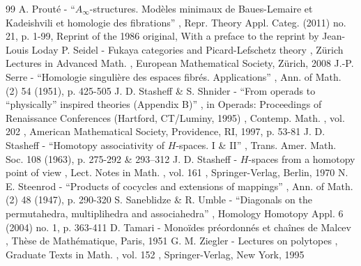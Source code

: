 \documentclass[10pt,a4paper]{amsart}
\numberwithin{equation}{section}\providecommand{\No}{}
\theoremstyle{plain}
\theoremstyle{definition}
\begin{document}
\begin{thebibliography}{99}
 A. Prouté - “$A_\infty $-structures. Modèles minimaux de Baues-Lemaire et Kadeishvili et homologie des fibrations” , Repr. Theory Appl. Categ. (2011) no. 21, p. 1-99, Reprint of the 1986 original, With a preface to the reprint by Jean-Louis Loday
 P. Seidel - Fukaya categories and Picard-Lefschetz theory , Zürich Lectures in Advanced Math. , European Mathematical Society, Zürich, 2008
 J.-P. Serre - “Homologie singulière des espaces fibrés. Applications” , Ann. of Math. (2) 54 (1951), p. 425-505
 J. D. Stasheff \& S. Shnider - “From operads to “physically” inspired theories (Appendix B)” , in Operads: Proceedings of Renaissance Conferences (Hartford, CT/Luminy, 1995) , Contemp. Math. , vol. 202 , American Mathematical Society, Providence, RI, 1997, p. 53-81
 J. D. Stasheff - “Homotopy associativity of $H$-spaces. I \& II” , Trans. Amer. Math. Soc. 108 (1963), p. 275-292 \& 293–312
 J. D. Stasheff - $H$-spaces from a homotopy point of view , Lect. Notes in Math. , vol. 161 , Springer-Verlag, Berlin, 1970
 N. E. Steenrod - “Products of cocycles and extensions of mappings” , Ann. of Math. (2) 48 (1947), p. 290-320
 S. Saneblidze \& R. Umble - “Diagonals on the permutahedra, multiplihedra and associahedra” , Homology Homotopy Appl. 6 (2004) no. 1, p. 363-411
 D. Tamari - Monoïdes préordonnés et chaînes de Malcev , Thèse de Mathématique, Paris, 1951
 G. M. Ziegler - Lectures on polytopes , Graduate Texts in Math. , vol. 152 , Springer-Verlag, New York, 1995
\end{thebibliography}
\end{document}
